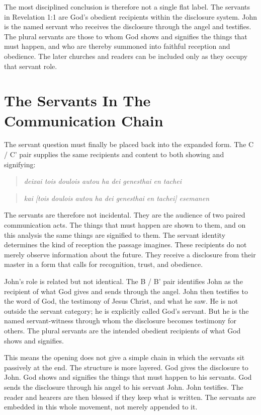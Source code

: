 The most disciplined conclusion is therefore not a single flat label. The servants in Revelation 1:1 are God's obedient recipients within the disclosure system. John is the named servant who receives the disclosure through the angel and testifies. The plural servants are those to whom God shows and signifies the things that must happen, and who are thereby summoned into faithful reception and obedience. The later churches and readers can be included only as they occupy that servant role.

\section{The Servants In The Communication Chain}

The servant question must finally be placed back into the expanded form. The C / C' pair supplies the same recipients and content to both showing and signifying:

\begin{quote}
\textit{deixai tois doulois autou ha dei genesthai en tachei}
\end{quote}

\begin{quote}
\textit{kai [tois doulois autou ha dei genesthai en tachei] esemanen}
\end{quote}

The servants are therefore not incidental. They are the audience of two paired communication acts. The things that must happen are shown to them, and on this analysis the same things are signified to them. The servant identity determines the kind of reception the passage imagines. These recipients do not merely observe information about the future. They receive a disclosure from their master in a form that calls for recognition, trust, and obedience.

John's role is related but not identical. The B / B' pair identifies John as the recipient of what God gives and sends through the angel. John then testifies to the word of God, the testimony of Jesus Christ, and what he saw. He is not outside the servant category; he is explicitly called God's servant. But he is the named servant-witness through whom the disclosure becomes testimony for others. The plural servants are the intended obedient recipients of what God shows and signifies.

This means the opening does not give a simple chain in which the servants sit passively at the end. The structure is more layered. God gives the disclosure to John. God shows and signifies the things that must happen to his servants. God sends the disclosure through his angel to his servant John. John testifies. The reader and hearers are then blessed if they keep what is written. The servants are embedded in this whole movement, not merely appended to it.

